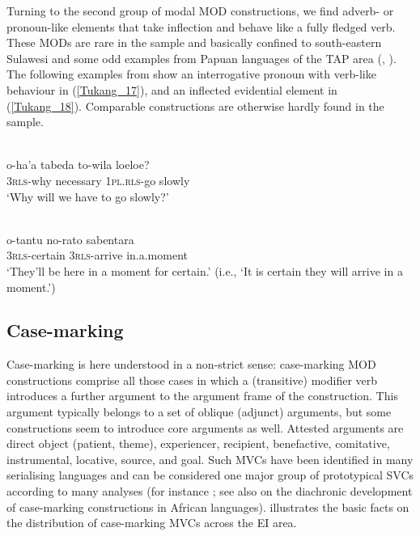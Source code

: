Turning to the second group of modal MOD constructions, we find adverb- or pronoun-like elements that take inflection and behave like a fully fledged verb. These MODs are rare in the sample and basically confined to south-eastern Sulawesi and some odd examples from Papuan languages of the TAP area (, ). The following examples from  show an interrogative pronoun with verb-like behaviour in (\ref{Tukang_17}), and an inflected evidential element in (\ref{Tukang_18}). Comparable constructions are otherwise hardly found in the sample.

\ea \label{Tukang_17}
\\
\gll o-ha'a tabeda to-wila loeloe? \\
3\textsc{rls}-why necessary 1\textsc{pl}.\textsc{rls}-go slowly \\
\glft `Why will we have to go slowly?'\\ 
\z

\ea \label{Tukang_18}
\\
\gll o-tantu no-rato sabentara \\
3\textsc{rls}-certain 3\textsc{rls}-arrive in.a.moment \\
\glft `They'll be here in a moment for certain.' (i.e., `It is certain they will arrive in a moment.')\\ 
\z

\subsection{Case-marking} \label{sec:case-marking}

Case-marking is here understood in a non-strict sense: case-marking MOD constructions comprise all those cases in which a (transitive) modifier verb introduces a further argument to the argument frame of the construction. This argument typically belongs to a set of oblique (adjunct) arguments, but some constructions seem to introduce core arguments as well. Attested arguments are direct object (patient, theme), experiencer, recipient, benefactive, comitative, instrumental, locative, source, and goal. Such MVCs have been identified in many serialising languages and can be considered one major group of prototypical SVCs according to many analyses (for instance \citealt{givon1991serial, Aikhenvald2006, haspelmath2016serial}; see also \citealt{lord1993historical} on the diachronic development of case-marking constructions in African languages).  illustrates the basic facts on the distribution of case-marking MVCs across the EI area.

